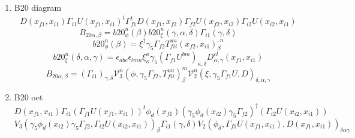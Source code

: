 \documentclass{article}[12pt]
\begin{document}
\begin{itemize}
\begin{enumerate}
\item B20 diagram
\begin{eqnarray}
D(x_{f1},x_{i1})\Gamma_{i1}U(x_{f1},x_{i1})^t\Gamma_{f1}^tD(x_{f1},x_{f2})\Gamma_{f2}U(x_{f2},x_{i2})\Gamma_{i2}U(x_{i2},x_{i1}) 
\end{eqnarray}
$$
B_{20\alpha,\beta}=b20_{\phi}^n\left(\beta\right)b20_{\xi}^n\left(\gamma,\alpha,\delta\right)\Gamma_{i1}\left(\gamma,\delta\right)
$$
$$
b20_{\phi}^{n}\left(\beta\right)=\xi^{\dagger}\gamma_5\Gamma_{f2}T_{fii}^{uu}\left(x_{f2},x_{i1}\right)^{,n}_{\beta}
$$
$$
b20_{\xi}^{n}\left(\delta,\alpha,\gamma\right)=\epsilon_{abc}\epsilon_{lmn}\xi^{a}_{\kappa}\gamma_5\left(\Gamma_{f1}U^{bm}\right)_{\kappa,\delta}D^{cl}_{\alpha,\gamma}\left(x_{f1},x_{i1}\right)
$$
$$
B_{20\alpha,\beta}=\left(\Gamma_{i1}\right)_{\gamma,\delta}{\mathcal V}_{3}^{n}\left(
\phi,\gamma_5\Gamma_{f2},T_{fii}^{uu}\right)^{m}_{\beta}{\mathcal V}_{2}^{n}\left(\xi,\gamma_5\Gamma_{f1}U,D\right)_{\delta,\alpha,\gamma}
$$
\item B20 oet
$$
D(x_{f1},x_{i1})\Gamma_{i1}(\Gamma_{f1}U(x_{f1},x_{i1}))^t\phi_d(x_{f1})(\gamma_5\phi_d(x_{i2})\gamma_5\Gamma_{f2})^{\dagger}(\Gamma_{i2}U(x_{i2},x_{i1}))
$$
$$
V_3(\gamma_5\phi_d(x_{i2})\gamma_5\Gamma_{f2},\Gamma_{i2}U(x_{i2},x_{i1}))_{\beta}\Gamma_{i1}(\gamma,\delta)V_2(\phi_d,\Gamma_{f1}U(x_{f1},x_{i1}),D(x_{f1},x_{i1}))_{\delta\alpha\gamma}
$$


\end{enumerate}
\end{itemize}
\end{document}
